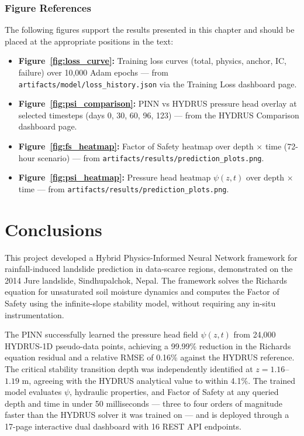 \documentclass[12pt]{report}
\begin{document}
\subsection{Figure References}

The following figures support the results presented in this chapter
and should be placed at the appropriate positions in the text:

\begin{itemize}
    \item \textbf{Figure~\ref{fig:loss_curve}:} Training loss curves
    (total, physics, anchor, IC, failure) over 10,000 Adam epochs —
    from \texttt{artifacts/model/loss\_history.json} via the
    Training Loss dashboard page.

    \item \textbf{Figure~\ref{fig:psi_comparison}:} PINN vs HYDRUS
    pressure head overlay at selected timesteps (days 0, 30, 60, 96,
    123) — from the HYDRUS Comparison dashboard page.

    \item \textbf{Figure~\ref{fig:fs_heatmap}:} Factor of Safety
    heatmap over depth $\times$ time (72-hour scenario) —
    from \texttt{artifacts/results/prediction\_plots.png}.

    \item \textbf{Figure~\ref{fig:psi_heatmap}:} Pressure head
    heatmap $\psi(z,t)$ over depth $\times$ time —
    from \texttt{artifacts/results/prediction\_plots.png}.
\end{itemize}
\chapter{Conclusions}

This project developed a Hybrid Physics-Informed Neural Network
framework for rainfall-induced landslide prediction in data-scarce
regions, demonstrated on the 2014 Jure landslide, Sindhupalchok,
Nepal. The framework solves the Richards equation for unsaturated
soil moisture dynamics and computes the Factor of Safety using the
infinite-slope stability model, without requiring any in-situ
instrumentation.

The PINN successfully learned the pressure head field $\psi(z,t)$
from 24,000 HYDRUS-1D pseudo-data points, achieving a 99.99\%
reduction in the Richards equation residual and a relative RMSE
of 0.16\% against the HYDRUS reference. The critical stability
transition depth was independently identified at $z = 1.16$--$1.19$
m, agreeing with the HYDRUS analytical value to within 4.1\%. The
trained model evaluates $\psi$, hydraulic properties, and Factor
of Safety at any queried depth and time in under 50 milliseconds —
three to four orders of magnitude faster than the HYDRUS solver it
was trained on — and is deployed through a 17-page interactive
dual dashboard with 16 REST API endpoints.
\end{document}
